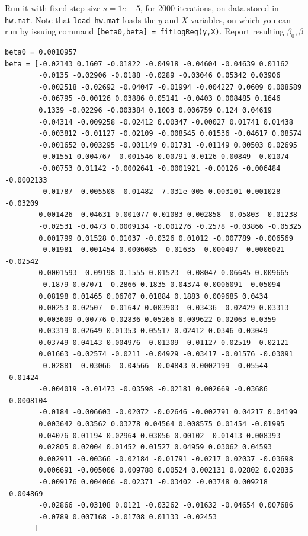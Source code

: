 \documentclass{article}
\begin{document}
Run it with fixed step size $s=1e-5$, for 2000 iterations, on data stored in \texttt{hw\theHW.mat}.
Note that \texttt{load hw\theHW.mat} loads the $y$ and $X$ variables, on which you can run by issuing command
\texttt{[beta0,beta] = fitLogReg(y,X)}.
Report resulting $\beta_0,\beta$
\begin{verbatim}
beta0 = 0.0010957
beta = [-0.02143 0.1607 -0.01822 -0.04918 -0.04604 -0.04639 0.01162
        -0.0135 -0.02906 -0.0188 -0.0289 -0.03046 0.05342 0.03906
        -0.002518 -0.02692 -0.04047 -0.01994 -0.004227 0.0609 0.008589
        -0.06795 -0.00126 0.03886 0.05141 -0.0403 0.008485 0.1646
        0.1339 -0.02296 -0.003384 0.1003 0.006759 0.124 0.04619
        -0.04314 -0.009258 -0.02412 0.00347 -0.00027 0.01741 0.01438
        -0.003812 -0.01127 -0.02109 -0.008545 0.01536 -0.04617 0.08574
        -0.001652 0.003295 -0.001149 0.01731 -0.01149 0.00503 0.02695
        -0.01551 0.004767 -0.001546 0.00791 0.0126 0.00849 -0.01074
        -0.00753 0.01142 -0.0002641 -0.0001921 -0.00126 -0.006484 -0.0002133
        -0.01787 -0.005508 -0.01482 -7.031e-005 0.003101 0.001028 -0.03209
        0.001426 -0.04631 0.001077 0.01083 0.002858 -0.05803 -0.01238
        -0.02531 -0.0473 0.0009134 -0.001276 -0.2578 -0.03866 -0.05325
        0.001799 0.01528 0.01037 -0.0326 0.01012 -0.007789 -0.006569
        -0.01981 -0.001454 0.0006085 -0.01635 -0.000497 -0.0006021 -0.02542
        0.0001593 -0.09198 0.1555 0.01523 -0.08047 0.06645 0.009665
        -0.1879 0.07071 -0.2866 0.1835 0.04374 0.0006091 -0.05094
        0.08198 0.01465 0.06707 0.01884 0.1883 0.009685 0.0434
        0.00253 0.02507 -0.01647 0.003903 -0.03436 -0.02429 0.03313
        0.003609 0.00776 0.02836 0.05266 0.009622 0.02063 0.0359
        0.03319 0.02649 0.01353 0.05517 0.02412 0.0346 0.03049
        0.03749 0.04143 0.004976 -0.01309 -0.01127 0.02519 -0.02121
        0.01663 -0.02574 -0.0211 -0.04929 -0.03417 -0.01576 -0.03091
        -0.02881 -0.03066 -0.04566 -0.04843 0.0002199 -0.05544 -0.01424
        -0.004019 -0.01473 -0.03598 -0.02181 0.002669 -0.03686 -0.0008104
        -0.0184 -0.006603 -0.02072 -0.02646 -0.002791 0.04217 0.04199
        0.003642 0.03562 0.03278 0.04564 0.008575 0.01454 -0.01995
        0.04076 0.01194 0.02964 0.03056 0.00102 -0.01413 0.008393
        0.02805 0.02004 0.01452 0.01527 0.04959 0.03062 0.04593
        0.002911 -0.00366 -0.02184 -0.01791 -0.0217 0.02037 -0.03698
        0.006691 -0.005006 0.009788 0.00524 0.002131 0.02802 0.02835
        -0.009176 0.004066 -0.02371 -0.03402 -0.03748 0.009218 -0.004869
        -0.02866 -0.03108 0.0121 -0.03262 -0.01632 -0.04654 0.007686
        -0.0789 0.007168 -0.01708 0.01133 -0.02453
       ]
\end{verbatim}
\end{document}
